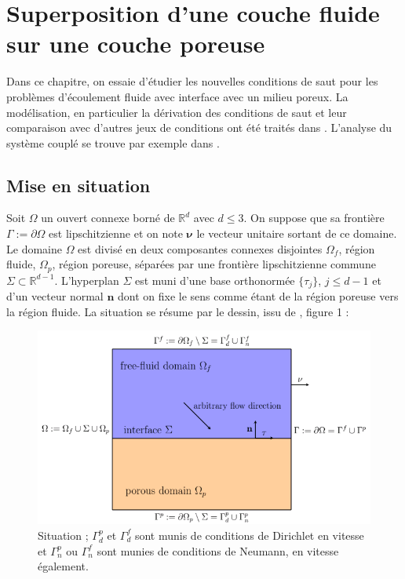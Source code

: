 \chapter{Superposition d'une couche fluide sur une couche poreuse}

Dans ce chapitre, on essaie d'étudier les nouvelles conditions de saut pour les problèmes d'écoulement fluide avec interface avec un milieu poreux. La modélisation, en particulier la dérivation des conditions de saut et leur comparaison avec d'autres jeux de conditions ont été traités dans \cite{angot:hal-01583856}. L'analyse du système couplé se trouve par exemple dans \cite{angot:hal-01635289}. 

\section{Mise en situation}

Soit $\Omega$ un ouvert connexe borné de $\mathbb{R}^d$ avec $d \leqslant 3$. On suppose que sa frontière $\Gamma := \partial \Omega$ est lipschitzienne et on note $\mathbf{\nu}$ le vecteur unitaire sortant de ce domaine. Le domaine $\Omega$ est divisé en deux composantes connexes disjointes $\Omega_f$, région fluide, $\Omega_p$, région poreuse, séparées par une frontière lipschitzienne commune $\Sigma \subset \mathbb{R}^{d-1}$. L'hyperplan $\Sigma$ est muni d'une base orthonormée $\{\tau_j\}$, $j \leqslant d-1$ et d'un vecteur normal $\mathbf{n}$ dont on fixe le sens comme étant de la région poreuse vers la région fluide. La situation se résume par le dessin, issu de \cite{angot:hal-03172378}, figure 1 :
\begin{figure}[htp]
    \centering
    \includegraphics[width=15cm]{Images/bicouche/situation.png}
    \caption{Situation ; $\Gamma^p_d$ et $\Gamma^f_d$ sont munis de conditions de Dirichlet en vitesse et $\Gamma^p_n$ ou $\Gamma^f_n$ sont munies de conditions de Neumann, en vitesse également.}
    \label{fig:bicouche}
\end{figure}

